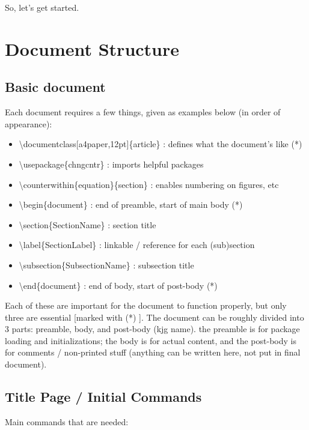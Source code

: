 \documentclass[a4paper,12pt]{article} %
\begin{document}
So, let's get started. 

\section{Document Structure} \label{Document Structure}
\subsection{Basic document} \label {Basic document}
Each document requires a few things, given as examples below (in order of appearance): 

\begin{itemize}
\itemsep=-0.5em
\item \textbackslash documentclass[a4paper,12pt]\{article\} : defines what the document's like (*)
\item \textbackslash usepackage\{chngcntr\}                 : imports helpful packages
\item \textbackslash counterwithin\{equation\}\{section\}   : enables numbering on figures, etc
\item \textbackslash begin\{document\}                      : end of preamble, start of main body (*)
\item \textbackslash section\{SectionName\}                 : section title
\item \textbackslash label\{SectionLabel\}                  : linkable / reference for each (sub)section
\item \textbackslash subsection\{SubsectionName\}           : subsection title
\item \textbackslash end\{document\}                        : end of body, start of post-body (*)
\end{itemize}

Each of these are important for the document to function properly, but only three are essential [marked with (*) ]. The document can be roughly divided into 3 parts: preamble, body, and post-body (kjg name). the preamble is for package loading and initializations; the body is for actual content, and the post-body is for comments / non-printed stuff (anything can be written here, not put in final document).

\subsection{Title Page / Initial Commands}
Main commands that are needed: 
\end{document}

